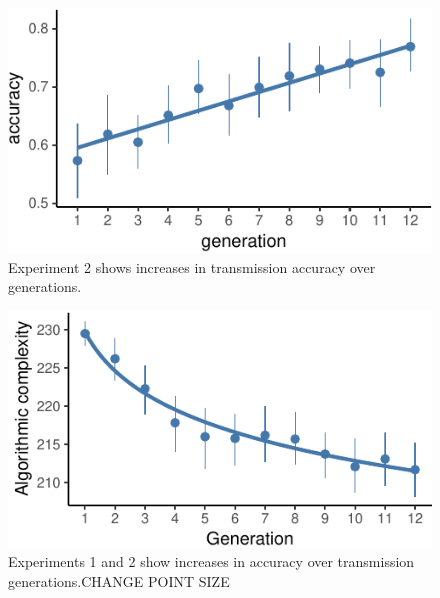 \documentclass[10pt, letterpaper]{article}
\newenvironment{CodeChunk}{}{}
\begin{document}
\begin{CodeChunk}
\begin{figure}[tb]

{\centering \includegraphics{figs/e2_acc_plot-1} 

}

\caption[Experiment 2 shows increases in transmission accuracy over generations]{Experiment 2 shows increases in transmission accuracy over generations.}\label{fig:e2_acc_plot}
\end{figure}
\end{CodeChunk}

\begin{CodeChunk}
\begin{figure}[tb]

{\centering \includegraphics{figs/e2_bdm_plot-1} 

}

\caption[Experiments 1 and 2 show increases in accuracy over transmission generations.CHANGE POINT SIZE]{Experiments 1 and 2 show increases in accuracy over transmission generations.CHANGE POINT SIZE}\label{fig:e2_bdm_plot}
\end{figure}
\end{CodeChunk}
\end{document}
